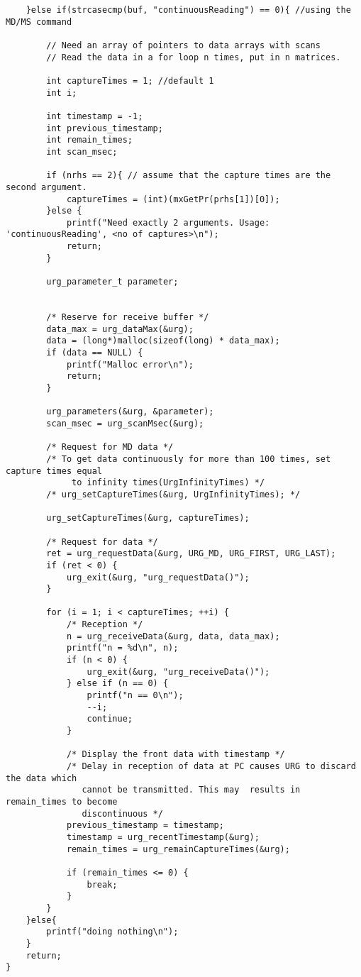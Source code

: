 \begin{lstlisting}
    }else if(strcasecmp(buf, "continuousReading") == 0){ //using the MD/MS command

    	// Need an array of pointers to data arrays with scans
    	// Read the data in a for loop n times, put in n matrices.

    	int captureTimes = 1; //default 1
    	int i;

		int timestamp = -1;
    	int previous_timestamp;
    	int remain_times;
		int scan_msec;

    	if (nrhs == 2){ // assume that the capture times are the second argument.
    		captureTimes = (int)(mxGetPr(prhs[1])[0]);
    	}else {
    		printf("Need exactly 2 arguments. Usage: 'continuousReading', <no of captures>\n");
    		return;
    	}

    	urg_parameter_t parameter;


    	/* Reserve for receive buffer */
    	data_max = urg_dataMax(&urg);
    	data = (long*)malloc(sizeof(long) * data_max);
    	if (data == NULL) {
    		printf("Malloc error\n");
    		return;
    	}

    	urg_parameters(&urg, &parameter);
    	scan_msec = urg_scanMsec(&urg);

    	/* Request for MD data */
    	/* To get data continuously for more than 100 times, set capture times equal
    	     to infinity times(UrgInfinityTimes) */
    	/* urg_setCaptureTimes(&urg, UrgInfinityTimes); */

    	urg_setCaptureTimes(&urg, captureTimes);

    	/* Request for data */
    	ret = urg_requestData(&urg, URG_MD, URG_FIRST, URG_LAST);
    	if (ret < 0) {
    		urg_exit(&urg, "urg_requestData()");
    	}

    	for (i = 1; i < captureTimes; ++i) {
    		/* Reception */
    		n = urg_receiveData(&urg, data, data_max);
    		printf("n = %d\n", n);
    		if (n < 0) {
    			urg_exit(&urg, "urg_receiveData()");
    		} else if (n == 0) {
    			printf("n == 0\n");
    			--i;
    			continue;
    		}

    		/* Display the front data with timestamp */
    		/* Delay in reception of data at PC causes URG to discard the data which
    	       cannot be transmitted. This may  results in remain_times to become
    	       discontinuous */
    		previous_timestamp = timestamp;
    		timestamp = urg_recentTimestamp(&urg);
    		remain_times = urg_remainCaptureTimes(&urg);

    		if (remain_times <= 0) {
    			break;
    		}
    	}
    }else{
    	printf("doing nothing\n");
    }
    return;
}
\end{lstlisting}


